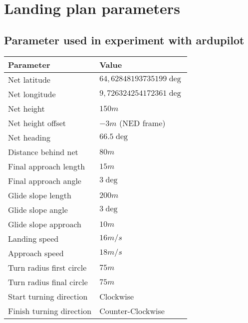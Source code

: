 \section{Landing plan parameters}

\subsection{Parameter used in experiment with ardupilot}

\begin{table}
\centering
\begin{tabular}{| p{4cm} | p{4cm} |}
\hline
\textbf{Parameter}			& \textbf{Value}			\\ \hline
Net latitude				& $64,62848193735199 \deg$ 	\\ \hline
Net longitude				& $9,726324254172361 \deg$ 	\\ \hline
Net height					& $150 m$					\\ \hline
Net height offset			& $-3 m$ (NED frame)		\\ \hline
Net heading					& $66.5 \deg$				\\ \hline
Distance behind net			& $80 m$					\\ \hline
Final approach length		& $15 m$					\\ \hline
Final approach angle		& $3 \deg$					\\ \hline
Glide slope length			& $200 m $					\\ \hline
Glide slope angle			& $3 \deg$					\\ \hline
Glide slope approach		& $10 m$					\\ \hline
Landing speed				& $16 m/s$					\\ \hline
Approach speed				& $18 m/s$					\\ \hline
Turn radius first circle	& $75 m$					\\ \hline
Turn radius final circle	& $75 m$					\\ \hline
Start turning direction		& Clockwise					\\ \hline
Finish turning direction	& Counter-Clockwise			\\ \hline
\end{tabular}
\end{table}